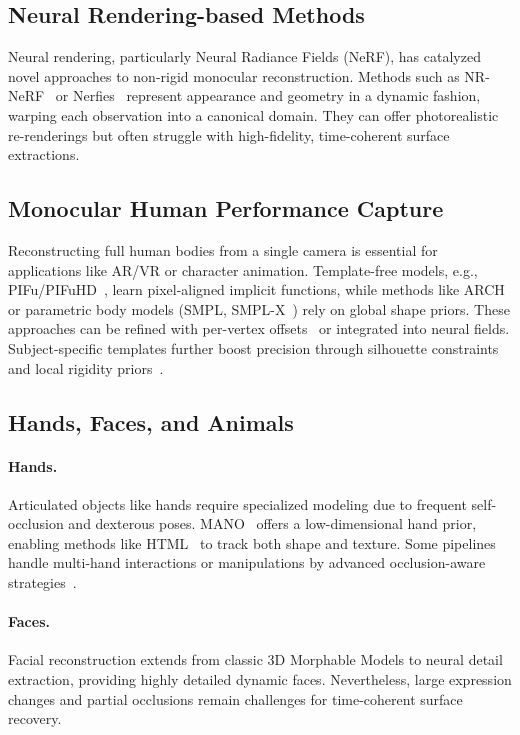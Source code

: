\documentclass[11pt]{article}
\begin{document}
\subsection{Neural Rendering-based Methods}
\label{subsec:neural_dyn}
Neural rendering, particularly Neural Radiance Fields (NeRF), has catalyzed novel approaches to non-rigid monocular reconstruction. Methods such as NR-NeRF~\cite{tretschk2021non} or Nerfies~\cite{park2021nerfies} represent appearance and geometry in a dynamic fashion, warping each observation into a canonical domain. They can offer photorealistic re-renderings but often struggle with high-fidelity, time-coherent surface extractions.

\subsection{Monocular Human Performance Capture}
\label{subsec:humans}
Reconstructing full human bodies from a single camera is essential for applications like AR/VR or character animation. Template-free models, e.g., PIFu/PIFuHD~\cite{saito2019pifu, saito2020pifuhd}, learn pixel-aligned implicit functions, while methods like ARCH~\cite{he2021arch++} or parametric body models (SMPL, SMPL-X~\cite{loper2023smpl, pavlakos2019expressive}) rely on global shape priors. These approaches can be refined with per-vertex offsets~\cite{xiang2020monoclothcap} or integrated into neural fields. Subject-specific templates further boost precision through silhouette constraints and local rigidity priors~\cite{habermann2019livecap, habermann2020deepcap}.

\subsection{Hands, Faces, and Animals}
\label{subsec:other_objects}
\paragraph{Hands.}
Articulated objects like hands require specialized modeling due to frequent self-occlusion and dexterous poses. MANO~\cite{romero2022embodied} offers a low-dimensional hand prior, enabling methods like HTML~\cite{qian2020html} to track both shape and texture. Some pipelines handle multi-hand interactions or manipulations by advanced occlusion-aware strategies~\cite{corona2022lisa}.

\paragraph{Faces.}
Facial reconstruction extends from classic 3D Morphable Models to neural detail extraction, providing highly detailed dynamic faces. Nevertheless, large expression changes and partial occlusions remain challenges for time-coherent surface recovery.
\end{document}
